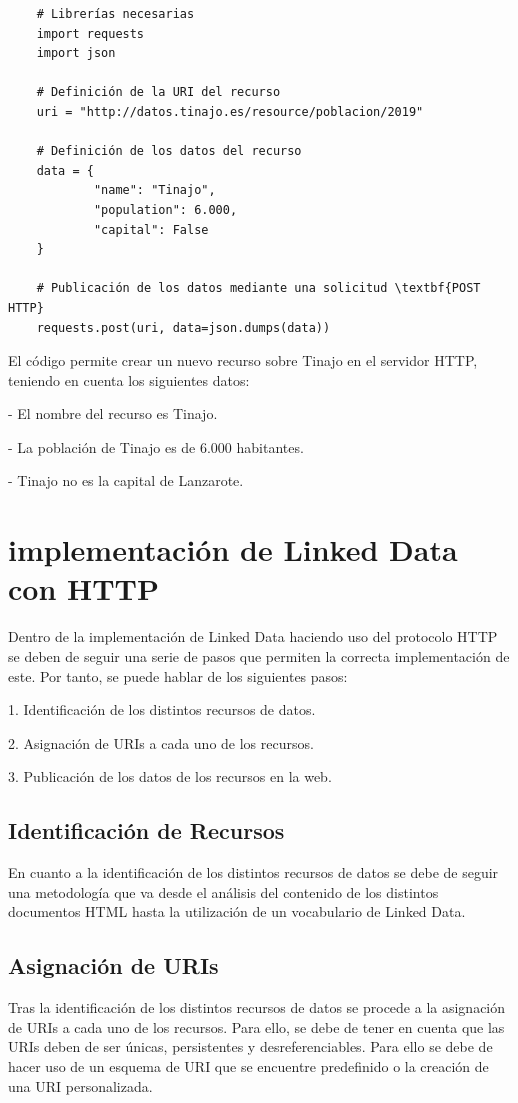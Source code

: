 \documentclass[11pt]{report}
\begin{document}
\begin{verbatim}
	# Librerías necesarias
	import requests
	import json

	# Definición de la URI del recurso
	uri = "http://datos.tinajo.es/resource/poblacion/2019"

	# Definición de los datos del recurso
	data = {
			"name": "Tinajo",
			"population": 6.000,
			"capital": False
	}

	# Publicación de los datos mediante una solicitud \textbf{POST HTTP}
	requests.post(uri, data=json.dumps(data))
\end{verbatim}

El código permite crear un nuevo recurso sobre Tinajo en el servidor HTTP, teniendo en cuenta los siguientes datos:

- El nombre del recurso es Tinajo.

- La población de Tinajo es de 6.000 habitantes.

- Tinajo no es la capital de Lanzarote.

\section{implementación de Linked Data con HTTP}

Dentro de la implementación de Linked Data haciendo uso del protocolo HTTP se deben de seguir una serie de pasos que permiten la correcta implementación de este. Por tanto, se puede hablar de los siguientes pasos:

1. Identificación de los distintos recursos de datos.

2. Asignación de URIs a cada uno de los recursos.

3. Publicación de los datos de los recursos en la web.

\subsection{Identificación de Recursos}

En cuanto a la identificación de los distintos recursos de datos se debe de seguir una metodología que va desde el análisis del contenido de los distintos documentos HTML hasta la utilización de un vocabulario de Linked Data.

\subsection{Asignación de URIs}

Tras la identificación de los distintos recursos de datos se procede a la asignación de URIs a cada uno de los recursos. Para ello, se debe de tener en cuenta que las URIs deben de ser únicas, persistentes y desreferenciables. Para ello se debe de hacer uso de un esquema de URI que se encuentre predefinido \cite{16} o la creación de una URI personalizada.
\end{document}
